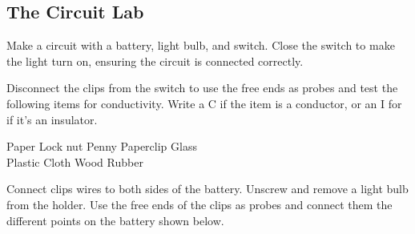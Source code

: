 \documentclass[answers]{exam}
\begin{document}
\clearpage



\clearpage

\subsection*{The Circuit Lab}

\begin{questions}
\question \label{Q1}
Make a circuit with a battery, light bulb, and switch. Close the switch to make the light turn on, ensuring the circuit is connected correctly. 

\question
Disconnect the clips from the switch to use the free ends as probes and test the following items for conductivity. Write a C if the item is a conductor, or an I for if it's an insulator.

\begin{center}
    Paper \fillin[I][2em] \hspace{2em}
    Lock nut \fillin[C][2em] \hspace{2em}
    Penny \fillin[C][2em] \hspace{2em}
    Paperclip \fillin[C][2em] \hspace{2em}
    Glass \fillin[I][2em] \hspace{2em} \\[1ex]
    Plastic \fillin[I][2em] \hspace{2em}
    Cloth \fillin[I][2em] \hspace{2em}
    Wood \fillin[I][2em] \hspace{2em}
    Rubber \fillin[I][2em] \hspace{2em}
\end{center}


\question
Connect clips wires to both sides of the battery. Unscrew and remove a light bulb from the holder. Use the free ends of the clips as probes and connect them the different points on the battery shown below.


\end{questions}
\end{document}
